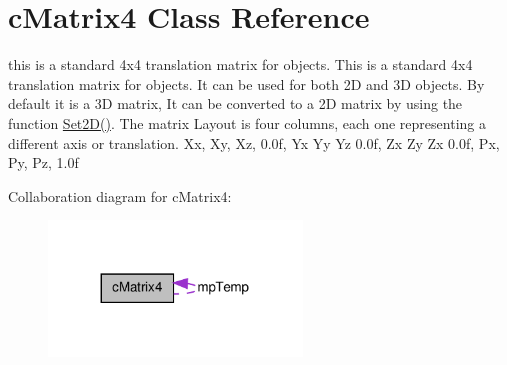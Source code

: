 \hypertarget{classc_matrix4}{
\section{cMatrix4 Class Reference}
\label{classc_matrix4}
}


this is a standard 4x4 translation matrix for objects. This is a standard 4x4 translation matrix for objects. It can be used for both 2D and 3D objects. By default it is a 3D matrix, It can be converted to a 2D matrix by using the function \hyperlink{classc_matrix4_ad24236403317622459c3309938be9d21}{Set2D()}. The matrix Layout is four columns, each one representing a different axis or translation. Xx, Xy, Xz, 0.0f, Yx Yy Yz 0.0f, Zx Zy Zx 0.0f, Px, Py, Pz, 1.0f  




Collaboration diagram for cMatrix4:\nopagebreak
\begin{figure}[H]
\begin{center}
\leavevmode
\includegraphics[width=191pt]{classc_matrix4__coll__graph}
\end{center}
\end{figure}

